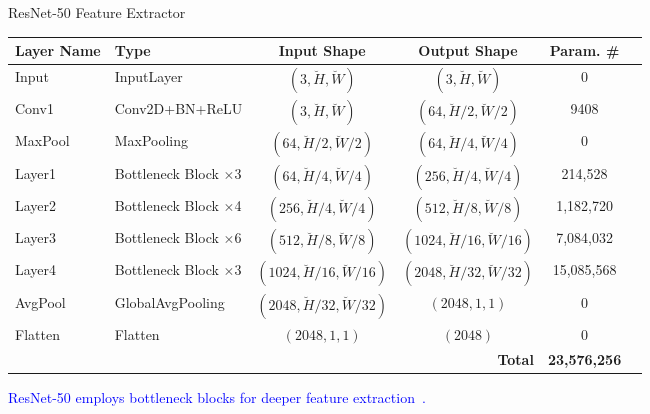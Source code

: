 \documentclass[aspectratio=169]{beamer}
\let\oldcite\cite %
\renewcommand{\cite}[1]{{\tiny\oldcite{#1}}}
\begin{document}
\begin{frame}{ResNet-50 Feature Extractor}
\begin{table}
\footnotesize
\begin{tabularx}{\linewidth}{p{1.5cm}lcccc}
\toprule
\textbf{Layer Name} & \textbf{Type} & \textbf{Input Shape} & \textbf{Output Shape} & \textbf{Param. \#} \\
\midrule
Input & InputLayer & $(3, \breve{H}, \breve{W})$ & $(3, \breve{H}, \breve{W})$ & 0 \\
Conv1 & Conv2D+BN+ReLU & $(3, \breve{H}, \breve{W})$ & $(64, \breve{H}/2, \breve{W}/2)$ & 9408 \\
MaxPool & MaxPooling & $(64, \breve{H}/2, \breve{W}/2)$ & $(64, \breve{H}/4, \breve{W}/4)$ & 0 \\
Layer1 & Bottleneck Block $\times$3 & $(64, \breve{H}/4, \breve{W}/4)$ & $(256, \breve{H}/4, \breve{W}/4)$ & 214,528 \\
Layer2 & Bottleneck Block $\times$4 & $(256, \breve{H}/4, \breve{W}/4)$ & $(512, \breve{H}/8, \breve{W}/8)$ & 1,182,720 \\
Layer3 & Bottleneck Block $\times$6 & $(512, \breve{H}/8, \breve{W}/8)$ & $(1024, \breve{H}/16, \breve{W}/16)$ & 7,084,032 \\
Layer4 & Bottleneck Block $\times$3 & $(1024, \breve{H}/16, \breve{W}/16)$ & $(2048, \breve{H}/32, \breve{W}/32)$ & 15,085,568 \\
AvgPool & GlobalAvgPooling & $(2048, \breve{H}/32, \breve{W}/32)$ & $(2048, 1, 1)$ & 0 \\
Flatten & Flatten & $(2048,1,1)$ & $(2048)$ & 0 \\
\midrule
\multicolumn{4}{r}{\textbf{Total}} & \textbf{23,576,256} \\
\midrule
\end{tabularx}
\end{table}
\begin{center}
    \textcolor{blue}{ResNet-50 employs bottleneck blocks for deeper feature extraction~\cite{mascarenhas2021comparison}.}
\end{center}
\end{frame}
\end{document}
